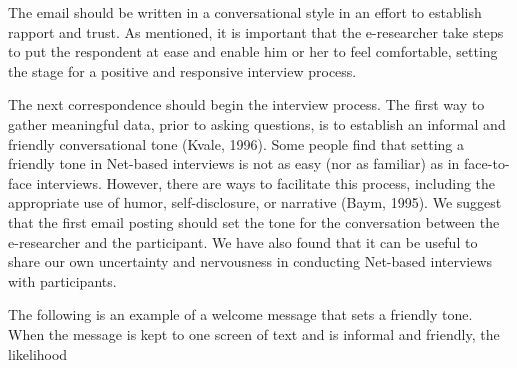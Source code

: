 \documentclass[a4paper]{book}
\begin{document}
The email should be written in a conversational style in an effort to establish rapport and trust. As mentioned, it is important that the e-researcher take steps to put the respondent at ease and enable him or her to feel comfortable, setting the stage for a positive and responsive interview process.

The next correspondence should begin the interview process. The first way to gather meaningful data, prior to asking questions, is to establish an informal and friendly conversational tone (Kvale, 1996). Some people find that setting a friendly tone in Net-based interviews is not as easy (nor as familiar) as in face-to-face interviews. However, there are ways to facilitate this process, including the appropriate use of humor, self-disclosure, or narrative (Baym, 1995). We suggest that the first email posting should set the tone for the conversation between the e-researcher and the participant. We have also found that it can be useful to share our own uncertainty and nervousness in conducting Net-based interviews with participants.

The following is an example of a welcome message that sets a friendly tone. When the message is kept to one screen of text and is informal and friendly, the likelihood
\end{document}
